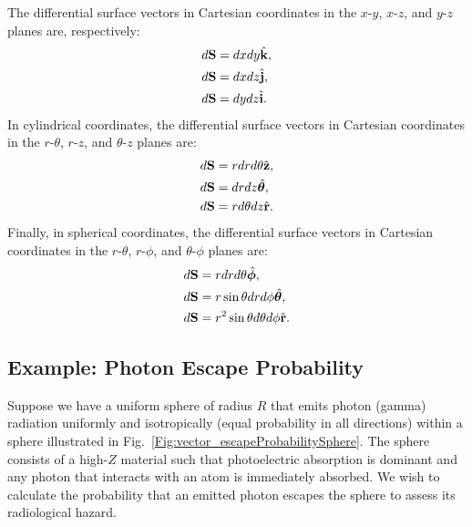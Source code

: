 The differential surface vectors in Cartesian coordinates in the $x$-$y$, $x$-$z$, and $y$-$z$ planes are, respectively:
\begin{subequations}
\begin{align}
  d\mathbf{S} &= dx dy \hat{\mathbf{k}}, \\
  d\mathbf{S} &= dx dz \hat{\mathbf{j}}, \\ 
  d\mathbf{S} &= dy dz \hat{\mathbf{i}}.
\end{align}
\end{subequations}
In cylindrical coordinates, the differential surface vectors in Cartesian coordinates in the $r$-$\theta$, $r$-$z$, and $\theta$-$z$ planes are:
\begin{subequations}
\begin{align}
  d\mathbf{S} &= r dr d\theta \hat{\mathbf{z}}, \\
  d\mathbf{S} &= dr dz \hat{\boldsymbol\theta}, \\ 
  d\mathbf{S} &= r d\theta dz \hat{\mathbf{r}}.
\end{align}
\end{subequations}
Finally, in spherical coordinates, the differential surface vectors in Cartesian coordinates in the $r$-$\theta$, $r$-$\phi$, and $\theta$-$\phi$ planes are:
\begin{subequations}
\begin{align}
  d\mathbf{S} &= r dr d\theta \hat{\boldsymbol\phi}, \\
  d\mathbf{S} &= r \sin \theta dr d\phi \hat{\boldsymbol\theta}, \\ 
  d\mathbf{S} &= r^2 \sin \theta d\theta d\phi \hat{\mathbf{r}}.
\end{align}
\end{subequations}


\subsection{Example: Photon Escape Probability}

Suppose we have a uniform sphere of radius $R$ that emits photon (gamma) radiation uniformly and isotropically (equal probability in all directions) within a sphere illustrated in Fig.~\ref{Fig:vector_escapeProbabilitySphere}. The sphere consists of a high-$Z$ material such that photoelectric absorption is dominant and any photon that interacts with an atom is immediately absorbed. We wish to calculate the probability that an emitted photon escapes the sphere to assess its radiological hazard.

